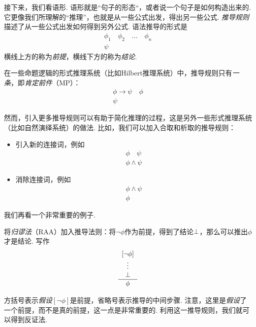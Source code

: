 接下来，我们看语形. 语形就是“句子的形态“，或者说一个句子是如何构造出来的. 它更像我们所理解的“推理”，也就是从一些公式出发，得出另一些公式. \textit{推导规则}描述了从一些公式出发如何得到另外公式. 语法推导的形式是
\[\begin{array}{c}
        \phi_1\quad\phi_2\quad\dots\quad\phi_n  \\\hline
        \psi
\end{array}\]
横线上方的称为\textit{前提}，横线下方的称为\textit{结论}. 

在一些命题逻辑的形式推理系统（比如Hilbert推理系统）中，推导规则只有\textit{一条}，即\textit{肯定前件}（MP）：
\[\begin{array}{c}
        \phi\to\psi\quad\phi  \\\hline
        \psi
\end{array}\]

然而，引入更多推导规则可以有助于简化推理的过程，这是另外一些形式推理系统（比如自然演绎系统）的做法. 比如，我们可以加入合取和析取的推导规则：
\begin{itemize}
    \item 引入新的连接词，例如
    \[\begin{array}{c}
         \phi\quad\psi  \\\hline
         \phi\wedge\psi
    \end{array}\]
    \item 消除连接词，例如
    \[\begin{array}{c}
        \phi\wedge\psi  \\\hline
        \phi
   \end{array}\]
\end{itemize}
    
我们再看一个非常重要的例子. 

\begin{example}
将\textit{归谬法}（RAA）加入推导法则：将$\neg\phi$作为前提，得到了结论$\bot$，那么可以推出$\phi$才是结论. 写作
    \[\begin{array}{c}
         [\neg\phi]  \\
         \vdots\\
         \bot\\\hline
         \phi
    \end{array}\]

方括号表示\textit{假设}$[\neg\phi]$是前提，省略号表示推导的中间步骤. 注意，这里是\textit{假设}了一个前提，而不是真的前提，这一点是非常重要的. 利用这一推导规则，我们就可以得到反证法. 
\end{example}


